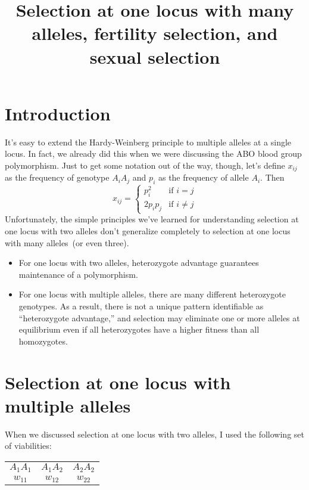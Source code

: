 \documentclass[12pt]{article}
\title{Selection at one locus with many alleles, fertility selection, and sexual selection}
\begin{document}
\maketitle

\thispagestyle{first}

\section*{Introduction}

It's easy to extend the Hardy-Weinberg principle to multiple alleles
at a single locus. In fact, we already did this when we were
discussing the ABO blood group polymorphism. Just to get some notation
out of the way, though, let's define $x_{ij}$ as the frequency of
genotype $A_iA_j$ and $p_i$ as the frequency of allele
$A_i$. Then
\[
x_{ij} = \left\{
\begin{array}{ll}
p_i^2   & \mbox{if $i = j$} \\
2p_ip_j & \mbox{if $i \ne j$}
\end{array}
\right.
\]
Unfortunately, the simple principles we've learned for understanding
selection at one locus with two alleles don't generalize completely to
selection at one locus with many alleles~(or even three).

\begin{itemize}

\item For one locus with two alleles, heterozygote advantage
  guarantees maintenance of a polymorphism.

\item For one locus with multiple alleles, there are many different
  heterozygote genotypes. As a result, there is not a unique pattern
  identifiable as ``heterozygote advantage,'' and selection may
  eliminate one or more alleles at equilibrium even if all
  heterozygotes have a higher fitness than all homozygotes.

\end{itemize}

\section*{Selection at one locus with multiple alleles}

When we discussed selection at one locus with two alleles, I used the
following set of viabilities:

\begin{center}
\begin{tabular}{ccc}
$A_1A_1$ & $A_1A_2$ & $A_2A_2$ \\
$w_{11}$ & $w_{12}$ & $w_{22}$
\end{tabular}
\end{center}
\end{document}
